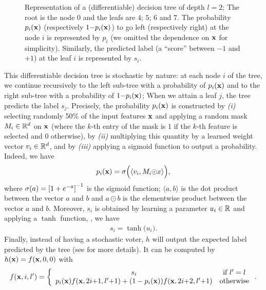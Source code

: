 \begin{noaddcontents}
\begin{figure}[h!]
\begin{center}

\end{center}
\caption{Representation of a (differentiable) decision tree of depth $l=2$; The root is the node $0$ and the leafs are $4$; $5$; $6$ and $7$. The probability $p_i(\mathbf{x})$ (respectively $1{-}p_i(\mathbf{x})$) to go left (respectively right) at the node $i$ is represented by $p_i$ (we omitted the dependence on $\mathbf{x}$ for simplicity). Similarly, the predicted label (a ``score'' between $-1$ and $+1$) at the leaf $i$ is represented by $s_i$.}
\label{ap:mv-robustness:fig:tree}
\end{figure}

This differentiable decision tree is stochastic by nature: at each node $i$ of the tree, we continue recursively to the left sub-tree with a probability of $p_i(\mathbf{x})$ and to the right sub-tree with a probability of $1{-}p_i(\mathbf{x})$; When we attain a leaf $j$, the tree predicts the label $s_j$.
Precisely, the probability $p_i(\mathbf{x})$ is constructed by {\it (i)} selecting randomly 50\% of the input features $\mathbf{x}$ and applying a random mask $M_i\in\mathbb{R}^d$ on $\mathbf{x}$ (where the $k$-th entry of the mask is $1$ if the $k$-th feature is selected and $0$ otherwise), by {\it (ii)} multiplying this quantity by a learned weight vector $v_i\in\mathbb{R}^d$, and by {\it (iii)} applying a sigmoid function to output a probability. 
Indeed, we have
\begin{align*}
p_i(\mathbf{x}) = \sigma\Big(\langle v_i, M_i{\odot}x\rangle\Big),
\end{align*}
where $\sigma(a)=\left[1+e^{-a}\right]^{-1}$ is the sigmoid function; $\langle a, b \rangle$ is the dot product between the vector $a$ and $b$ and $a \odot b$ is the elementwise product between the vector $a$ and $b$.
Moreover, $s_i$ is obtained by learning a parameter $u_i\in\mathbb{R}$ and applying a $\tanh$ function, \ie, we have 
\begin{align*}
     s_i = \tanh\!\Big( u_i\Big).
\end{align*}
Finally, instead of having a stochastic voter, $h$ will output the expected label predicted by the tree (see \citet{KontschiederFiterauCriminisiBulo2016} for more details). 
It can be computed by $h(\mathbf{x}) = f(\mathbf{x}, 0, 0)$ with
\begin{align*}
f(\mathbf{x}, i, l') =\left\{\begin{array}{cc}
    s_i  &  \text{if } l'=l\\
    p_i(\mathbf{x})f(\mathbf{x}, 2i{+}1, l'{+}1)+ (1-p_i(\mathbf{x}))f(\mathbf{x}, 2i{+}2, l'{+}1) &  \text{otherwise}
\end{array}\right..
\end{align*}


\end{noaddcontents}
